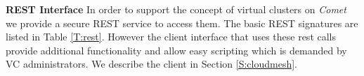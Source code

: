 {\parindent 0pt \bf REST Interface}
In order to support the concept of virtual clusters on {\em Comet\/} we
provide a secure REST service to access them. The basic REST
signatures are listed in Table \ref{T:rest}. However the client
interface that uses these rest calls provide additional functionality
and allow easy scripting which is demanded by VC
administrators. We describe the client in Section \ref{S:cloudmesh}.

